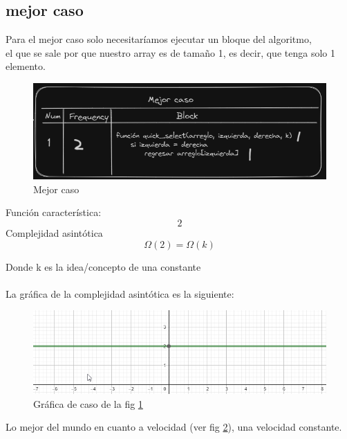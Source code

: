 \documentclass{article}
\begin{document}
\subsection*{mejor caso}
Para el mejor caso solo necesitaríamos ejecutar un bloque del algoritmo,\\
el que se sale por que nuestro array es de tamaño 1, es decir, que tenga solo 1 elemento. 
\begin{figure}[H]
  \centering
  \includegraphics[scale=0.8]{../imgs/q2.png}
  \caption{Mejor caso}
  \label{Fig:1}
\end{figure}

  Función característica: 
  \begin{equation*}
    2 
  \end{equation*}
  Complejidad asintótica
  \begin{equation*}
    \Omega(2) = \Omega(k)
  \end{equation*}

  Donde k es la idea/concepto de una constante\\
  \\
  La gráfica de la complejidad asintótica es la siguiente: 
  \begin{figure}[H]
    \centering
    \includegraphics[scale=0.8]{../imgs/q4.png}
    \caption{Gráfica de caso de la fig \ref{Fig:1}}
    \label{Fig:2}
  \end{figure}

  Lo mejor del mundo en cuanto a velocidad (ver fig \ref{Fig:2}), una velocidad constante.
\end{document}
